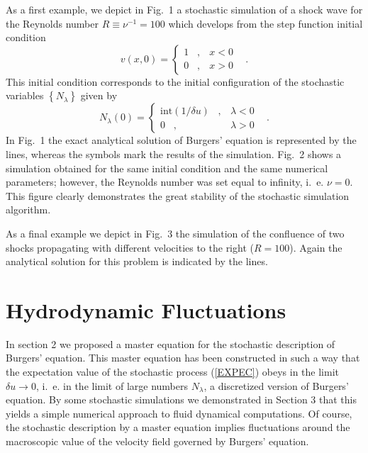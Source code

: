 As a first example, we depict in Fig.~1 a stochastic simulation of a shock
wave for the Reynolds number $R \equiv \nu^{-1}=100$
which develops from the step function initial condition
\begin{equation}
\label{INIT1}
v(x,0) = \left\{ \begin{array}{cc}
                 1 \;\;\;, & x<0  \\
                 0 \;\;\;, & x>0
                 \end{array} \right. \;\;\; .
\end{equation}
This initial condition corresponds to the initial configuration
of the stochastic variables $\left\{N_{\lambda}\right\}$ given by
\begin{equation}
\label{INIT2}
N_{\lambda}(0) = \left\{ \begin{array}{rc}
                 \mbox{int}(1/\delta u) \;\;\;, & \lambda < 0  \\
                 0 \;\;\;, & \lambda>0
                 \end{array} \right. \;\;\; .
\end{equation}
In Fig.~1 the exact analytical solution of Burgers' equation is represented
by the lines, whereas the symbols mark the results of the simulation.
Fig.~2 shows a simulation obtained for the same initial condition and the same
numerical parameters; however, the Reynolds number was set equal to
infinity, i.~e. $\nu = 0$. This figure clearly demonstrates the great stability
of the stochastic simulation algorithm. 

As a final example we depict in Fig.~3 the simulation of the
confluence of two shocks propagating with different velocities to the right
($R=100$). Again the analytical solution for this problem \cite{WHITHAM}
is indicated by the lines.

\section{Hydrodynamic Fluctuations}
In section 2 we proposed a master equation for the stochastic
description of Burgers' equation. This master equation
has been constructed in such a way that the
expectation value of the stochastic process  (\ref{EXPEC}) obeys
in the limit $\delta u \longrightarrow 0$, i.~e. in the limit of
large numbers $N_{\lambda}$, a discretized version of Burgers' equation.
By some stochastic simulations we demonstrated in Section 3 that
this yields a simple numerical approach to fluid dynamical
computations. Of course, the stochastic description by a master equation
implies fluctuations around the macroscopic value of the
velocity field governed by Burgers' equation.

